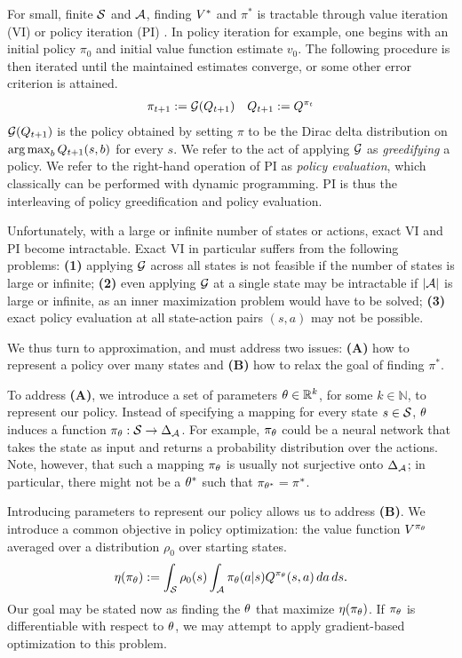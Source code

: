 \documentclass[\main/thesis.tex]{subfiles}
\begin{document}
For small, finite $\mathcal{S}$ and $\mathcal{A}$, finding $V^*$ and $\pi^*$ is tractable through value iteration (VI) or policy iteration (PI) \citep{sutton2018reinforcement}. In policy iteration for example, one begins with an initial policy $\pi_0$ and initial value function estimate $v_0$. The following procedure is then iterated until the maintained estimates converge, or some other error criterion is attained.
\begin{align*}
    \pi_{t + 1} := \mathcal{G}(Q_{t + 1}) & & Q_{t + 1} := Q^{\pi_t}
\end{align*}
$\mathcal{G}(Q_{t + 1})$ is the policy obtained by setting $\pi$ to be the Dirac delta distribution on $\operatorname*{arg\,max}_b Q_{t + 1}(s, b)$ for every $s$. We refer to the act of applying $\mathcal{G}$ as \textit{greedifying} a policy. We refer to the right-hand operation of PI as \textit{policy evaluation}, which classically can be performed with dynamic programming. PI is thus the interleaving of policy greedification and policy evaluation. 

Unfortunately, with a large or infinite number of states or actions, exact VI and PI become intractable. Exact VI in particular suffers from the following problems: \textbf{(1)} applying $\mathcal{G}$ across all states is not feasible if the number of states is large or infinite; \textbf{(2)} even applying $\mathcal{G}$ at a single state may be intractable if $|\mathcal{A}|$ is large or infinite, as an inner maximization problem would have to be solved; \textbf{(3)} exact policy evaluation at all state-action pairs $(s, a)$ may not be possible. 

We thus turn to approximation, and must address two issues: \textbf{(A)} how to represent a policy over many states and \textbf{(B)} how to relax the goal of finding $\pi^*$. 

To address \textbf{(A)}, we introduce a set of parameters $\theta \in \mathbb{R}^k$, for some $k \in \mathbb{N}$, to represent our policy. Instead of specifying a mapping for every state $s \in \mathcal{S}$, $\theta$ induces a function $\pi_\theta : \mathcal{S} \to \Delta_{\mathcal{A}}$. For example, $\pi_\theta$ could be a neural network that takes the state as input and returns a probability distribution over the actions. Note, however, that such a mapping $\pi_\theta$ is usually not surjective onto $\Delta_{\mathcal{A}}$; in particular, there might not be a $\theta^*$ such that $\pi_{\theta^*} = \pi^*$. 

Introducing parameters to represent our policy allows us to address \textbf{(B)}. We introduce a common objective in policy optimization: the value function $V^{\pi_\theta}$ averaged over a distribution $\rho_0$ over starting states.
\begin{equation*}
    \eta(\pi_\theta) := \int_{\mathcal{S}} \rho_0(s) \int_{\mathcal{A}} \pi_\theta(a | s) Q^{\pi_\theta}(s, a) \, da \, ds.
\end{equation*}
Our goal may be stated now as finding the $\theta$ that maximize $\eta(\pi_\theta)$. If $\pi_\theta$ is differentiable with respect to $\theta$, we may attempt to apply gradient-based optimization to this problem. 
\end{document}
